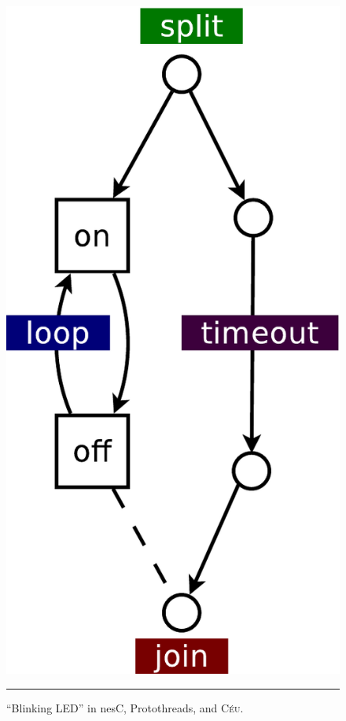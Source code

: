 \documentclass[letterpaper]{sig-alternate}
\newcommand{\CEU}{\textsc{C\'{e}u}\xspace}
\begin{document}
\begin{figure}[!t]
\begin{minipage}[t]{0.15\linewidth}
\includegraphics[width=\textwidth]{dia}
\end{minipage}
%
\hspace{0.0cm}
%
\rule{18cm}{0.37pt}
\caption{ ``Blinking LED'' in
    nesC,
    Protothreads,
    and \CEU. %
\label{lst.all}
}
\end{figure}
\end{document}
